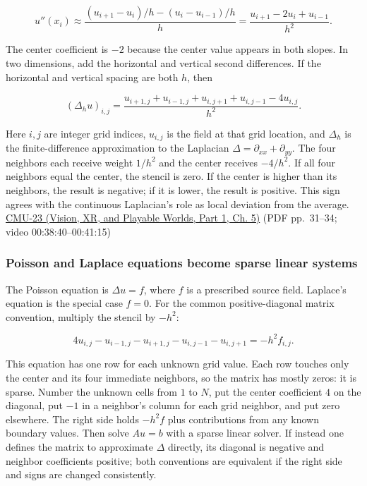 \[
u''(x_i)\approx\frac{(u_{i+1}-u_i)/h-(u_i-u_{i-1})/h}{h}
=\frac{u_{i+1}-2u_i+u_{i-1}}{h^2}.
\]

The center coefficient is \(-2\) because the center value appears in both slopes. In two dimensions, add the horizontal and vertical second differences. If the horizontal and vertical spacing are both \(h\), then

\[
(\Delta_h u)_{i,j}=\frac{u_{i+1,j}+u_{i-1,j}+u_{i,j+1}+u_{i,j-1}-4u_{i,j}}{h^2}.
\]

Here \(i,j\) are integer grid indices, \(u_{i,j}\) is the field at that grid location, and \(\Delta_h\) is the finite-difference approximation to the Laplacian \(\Delta=\partial_{xx}+\partial_{yy}\). The four neighbors each receive weight \(1/h^2\) and the center receives \(-4/h^2\). If all four neighbors equal the center, the stencil is zero. If the center is higher than its neighbors, the result is negative; if it is lower, the result is positive. This sign agrees with the continuous Laplacian's role as local deviation from the average. \href{../07-Vision-XR-and-Playable-Worlds-P01/main.pdf\#nameddest=04-visual-computing-ii-ch036-cmu-23---physically-based-animation-and-pdes}{CMU-23 (Vision, XR, and Playable Worlds, Part 1, Ch. 5)} (PDF pp.~31--34; video 00:38:40--00:41:15)

\subsubsection{Poisson and Laplace equations become sparse linear systems}\label{04-visual-computing-ii-ch030-poisson-and-laplace-equations-become-sparse-linear-systems}

\hypertarget{04-visual-computing-ii-ch030-poisson-and-laplace-equations-become-sparse-linear-systems}{}

The Poisson equation is \(\Delta u=f\), where \(f\) is a prescribed source field. Laplace's equation is the special case \(f=0\). For the common positive-diagonal matrix convention, multiply the stencil by \(-h^2\):

\[
4u_{i,j}-u_{i-1,j}-u_{i+1,j}-u_{i,j-1}-u_{i,j+1}=-h^2f_{i,j}.
\]

This equation has one row for each unknown grid value. Each row touches only the center and its four immediate neighbors, so the matrix has mostly zeros: it is sparse. Number the unknown cells from \(1\) to \(N\), put the center coefficient \(4\) on the diagonal, put \(-1\) in a neighbor's column for each grid neighbor, and put zero elsewhere. The right side holds \(-h^2f\) plus contributions from any known boundary values. Then solve \(Au=b\) with a sparse linear solver. If instead one defines the matrix to approximate \(\Delta\) directly, its diagonal is negative and neighbor coefficients positive; both conventions are equivalent if the right side and signs are changed consistently.

